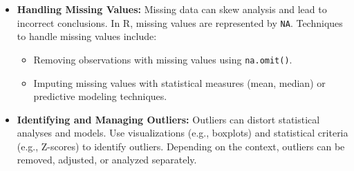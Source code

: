 \documentclass[
]{book}
\newenvironment{Shaded}{\begin{snugshade}}{\end{snugshade}}
\newcommand{\AttributeTok}[1]{\textcolor[rgb]{0.13,0.29,0.53}{#1}}
\newcommand{\CommentTok}[1]{\textcolor[rgb]{0.56,0.35,0.01}{\textit{#1}}}
\newcommand{\ConstantTok}[1]{\textcolor[rgb]{0.56,0.35,0.01}{#1}}
\newcommand{\DecValTok}[1]{\textcolor[rgb]{0.00,0.00,0.81}{#1}}
\newcommand{\FunctionTok}[1]{\textcolor[rgb]{0.13,0.29,0.53}{\textbf{#1}}}
\newcommand{\NormalTok}[1]{#1}
\newcommand{\OtherTok}[1]{\textcolor[rgb]{0.56,0.35,0.01}{#1}}
\newcommand{\SpecialCharTok}[1]{\textcolor[rgb]{0.81,0.36,0.00}{\textbf{#1}}}
\providecommand{\tightlist}{%
  \setlength{\itemsep}{0pt}\setlength{\parskip}{0pt}}
\begin{document}
\begin{itemize}
\item
  \textbf{Handling Missing Values:} Missing data can skew analysis and lead to incorrect conclusions. In R, missing values are represented by \texttt{NA}. Techniques to handle missing values include:

  \begin{itemize}
  \tightlist
  \item
    Removing observations with missing values using \texttt{na.omit()}.
  \item
    Imputing missing values with statistical measures (mean, median) or predictive modeling techniques.
  \end{itemize}
\end{itemize}

\begin{Shaded}
\end{Shaded}

\begin{itemize}
\tightlist
\item
  \textbf{Identifying and Managing Outliers:} Outliers can distort statistical analyses and models. Use visualizations (e.g., boxplots) and statistical criteria (e.g., Z-scores) to identify outliers. Depending on the context, outliers can be removed, adjusted, or analyzed separately.
\end{itemize}

\begin{Shaded}
\end{Shaded}
\end{document}
